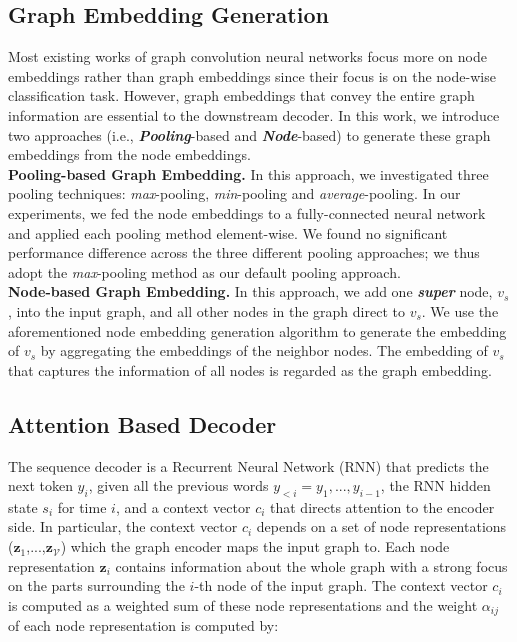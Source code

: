 \documentclass{article} \usepackage{iclr2019_conference,times}
\begin{document}
\subsection{Graph Embedding Generation}
Most existing works of graph convolution neural networks focus more on node embeddings rather than graph embeddings since their focus is on the node-wise classification task.
However, graph embeddings that convey the entire graph information are essential to the downstream decoder.
In this work, we introduce two approaches (i.e., \textit{\textbf{Pooling}}-based and \textit{\textbf{Node}}-based) to generate these graph embeddings from the node embeddings. \\
\textbf{Pooling-based Graph Embedding.}
In this approach, we investigated three pooling techniques: \textit{max}-pooling, \textit{min}-pooling and \textit{average}-pooling. In our experiments, we fed the node embeddings to a fully-connected neural network and applied each pooling method element-wise.
We found no significant performance difference across the three different pooling approaches; we thus adopt the \textit{max}-pooling method as our default pooling approach. \\
\textbf{Node-based Graph Embedding.}
In this approach, we add one \textbf{\textit{super}} node, $v_{s}$, into the input graph,
and all other nodes in the graph direct to $v_{s}$.
We use the aforementioned node embedding generation algorithm to generate the embedding of $v_{s}$ by aggregating the embeddings of the neighbor nodes.
The embedding of $v_{s}$ that captures the information of all nodes is regarded as the graph embedding.



\subsection{Attention Based Decoder}
The sequence decoder is a Recurrent Neural Network (RNN) that predicts the next token $y_{i}$, given all the previous words
$y_{<i} = y_{1},...,y_{i-1}$, the RNN hidden state $s_{i}$ for time $i$, and
a context vector $c_{i}$ that directs attention to the encoder side.
In particular, the context vector $c_{i}$ depends on a set of node representations ($\textbf{z}_{1}$,...,$\textbf{z}_{\mathcal{V}}$)
which the graph encoder maps the input graph to.
Each node representation $\textbf{z}_{i}$ contains information about the whole graph with a strong focus on the parts surrounding the
$i$-th node of the input graph. The context vector $c_{i}$ is computed as a weighted sum of these node representations and the weight $\alpha_{ij}$ of each node representation is computed by:
\end{document}
